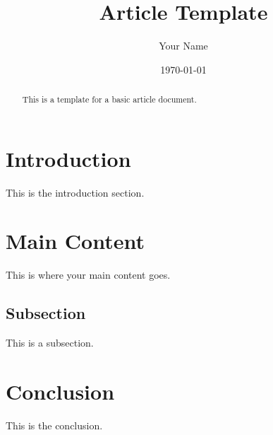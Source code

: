 \documentclass{article}
\title{Article Template}
\author{Your Name}
\date{\today}
\begin{document}
\maketitle

\begin{abstract}
This is a template for a basic article document.
\end{abstract}

\section{Introduction}

This is the introduction section.

\section{Main Content}

This is where your main content goes.

\subsection{Subsection}

This is a subsection.

\section{Conclusion}

This is the conclusion.
\end{document}

